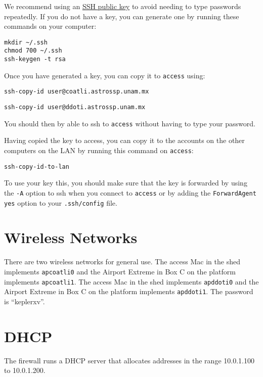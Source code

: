 We recommend using an \href{https://help.ubuntu.com/community/SSH/OpenSSH/Keys}{SSH public key} to avoid needing to type passwords repeatedly. If you do not have a key, you can generate one by running these commands on your computer:
\begin{verbatim}
mkdir ~/.ssh
chmod 700 ~/.ssh
ssh-keygen -t rsa
\end{verbatim}
Once you have generated a key, you can copy it to \verb|access| using:
\ifcoatli
\begin{verbatim}
ssh-copy-id user@coatli.astrossp.unam.mx
\end{verbatim}
\fi
\ifddoti
\begin{verbatim}
ssh-copy-id user@ddoti.astrossp.unam.mx
\end{verbatim}
\fi
You should then by able to ssh to \verb|access| without having to type your password.

Having copied the key to access, you can copy it to the {\projectaccount} accounts on the other computers on the LAN by running this command on \verb|access|:
\begin{verbatim}
ssh-copy-id-to-lan
\end{verbatim}
To use your key this, you should make sure that the key is forwarded by using the \verb|-A| option to ssh when you connect to \verb|access| or by adding the \verb|ForwardAgent yes| option to your \verb|.ssh/config| file.

\section{Wireless Networks}

There are two wireless networks for general use. 
\ifcoatli
The access Mac in the shed implements \verb|apcoatli0| and the Airport Extreme in Box C on the platform implements \verb|apcoatli1|. 
\fi
\ifddoti
The access Mac in the shed implements \verb|apddoti0| and the Airport Extreme in Box C on the platform implements \verb|apddoti1|. 
\fi
The password is “keplerxv”.

\section{DHCP}

The firewall runs a DHCP server that allocates addresses in the range 10.0.1.100 to 10.0.1.200.

